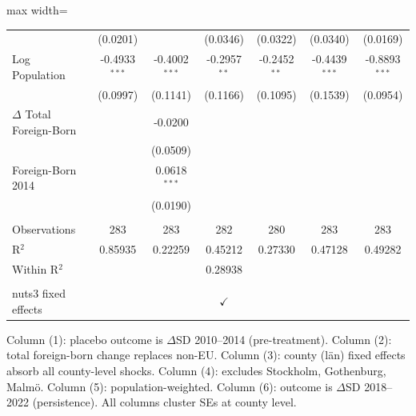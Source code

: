 \begin{table}[htbp]
\begin{adjustbox}{max width=\textwidth}
\begin{tabular}{lcccccc}
                                    & (0.0201)              &                  & (0.0346)        & (0.0322)       & (0.0340)         & (0.0169)\\   
      Log Population                & -0.4933$^{***}$       & -0.4002$^{***}$  & -0.2957$^{**}$  & -0.2452$^{**}$ & -0.4439$^{***}$  & -0.8893$^{***}$\\   
                                    & (0.0997)              & (0.1141)         & (0.1166)        & (0.1095)       & (0.1539)         & (0.0954)\\   
      $\Delta$ Total Foreign-Born   &                       & -0.0200          &                 &                &                  &   \\   
                                    &                       & (0.0509)         &                 &                &                  &   \\   
      Foreign-Born 2014             &                       & 0.0618$^{***}$   &                 &                &                  &   \\   
                                    &                       & (0.0190)         &                 &                &                  &   \\   
       \\
      Observations                  & 283                   & 283              & 282             & 280            & 283              & 283\\  
      R$^2$                         & 0.85935               & 0.22259          & 0.45212         & 0.27330        & 0.47128          & 0.49282\\  
      Within R$^2$                  &                       &                  & 0.28938         &                &                  & \\  
       \\
      nuts3 fixed effects           &                       &                  & $\checkmark$    &                &                  & \\  
      \bottomrule
   \end{tabular}
   \end{adjustbox}
   
   \par \raggedright 
   Column (1): placebo outcome is $\Delta$SD 2010--2014 (pre-treatment). Column (2): total foreign-born change replaces non-EU. Column (3): county (l\"an) fixed effects absorb all county-level shocks. Column (4): excludes Stockholm, Gothenburg, Malm\"o. Column (5): population-weighted. Column (6): outcome is $\Delta$SD 2018--2022 (persistence). All columns cluster SEs at county level.
\end{table}



